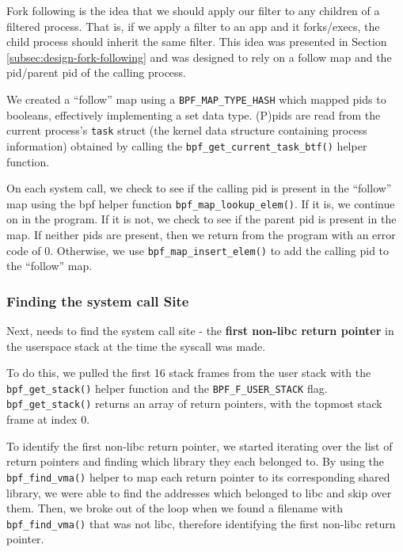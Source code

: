 Fork following is the idea that we should apply our filter to any children of a
filtered process. That is, if we apply a filter to an app and it forks/execs,
the child process should inherit the same filter. This idea was
presented in Section \ref{subsec:design-fork-following} and was designed to rely
on a follow map and the \ac{pid}/parent \ac{pid} of the calling
process.

We created a ``follow'' map using a \texttt{BPF\_MAP\_TYPE\_HASH} which mapped
\ac{pid}s to booleans, effectively implementing a set data type. (P)\acp{pid}
are read from the current process's \texttt{task} struct (the kernel data
structure containing process information) obtained by calling the
\texttt{bpf\_get\_current\_task\_btf()} helper function. 

On each system call, we check to see if the calling \ac{pid} is present in the
``follow'' map using the \ac{bpf} helper function \texttt{bpf\_map\_lookup\_elem()}.
If it is, we continue  on in the program. If it is not, we check to see if
the parent \ac{pid} is present in the map. If neither \acp{pid} are present, then
we return from the program with an error code of 0. Otherwise, we
use \texttt{bpf\_map\_insert\_elem()} to add the calling \ac{pid} to
the  ``follow'' map.

\subsubsection{Finding the system call Site}\label{subsec:impl-syscall-site}

Next, \af needs to find the system call site - the \textbf{first non-\ac{libc} return pointer} in the userspace stack at the time the syscall was made.

To do this, we pulled the first 16 stack frames from the user stack with the 
\texttt{bpf\_get\_stack()} helper function and the \texttt{BPF\_F\_USER\_STACK}
flag. \texttt{bpf\_get\_stack()} returns an array of return pointers, with the
topmost stack frame at index 0. 

To identify the first non-\ac{libc} return pointer, we started iterating over
the list of return pointers and finding which library they each belonged to.
By using the \texttt{bpf\_find\_vma()} helper to map each return pointer to its
corresponding shared library, we were able to find the addresses which belonged
to \ac{libc} and skip over them. Then, we broke out of the loop when we found a
filename with \texttt{bpf\_find\_vma()} that was not \ac{libc}, therefore
identifying the first non-\ac{libc} return pointer.

